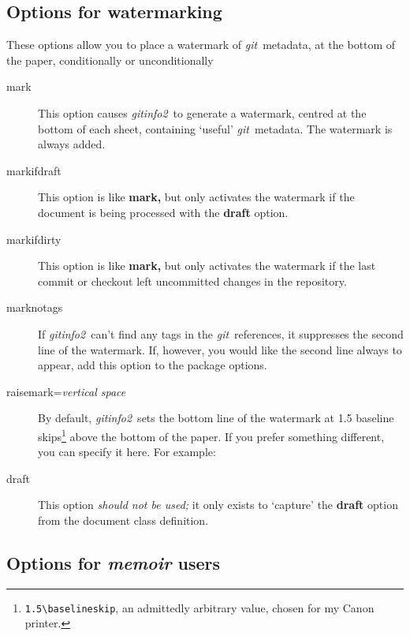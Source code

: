 \documentclass[draft,a4paper,12pt,twoside,openany]{memoir}
\newcommand{\sfit}[1]{\textit{#1}}
\newcommand{\git}{\sfit{git}}
\newcommand{\tpname}{\sfit{gitinfo2}}
\begin{document}
\subsection{Options for watermarking}

These options allow you to place a watermark of \git\ metadata, 
at the bottom of the paper, conditionally or unconditionally

\begin{description}

\item[mark]
This option causes \tpname\ to generate a watermark, 
centred at the bottom of each sheet,
containing `useful' \git\ metadata. 
The watermark is always added.

\item[markifdraft]
This option is like {\ttfamily\bfseries mark,}
but only activates the watermark if the document is being processed
with the {\ttfamily\bfseries draft} option. 

\item[markifdirty]
This option is like {\ttfamily\bfseries mark,}
but only activates the watermark if the last commit or checkout left 
uncommitted changes in the repository.

\item[marknotags]
If \tpname\ can't find any tags in the \git\ references,
it suppresses the second line of the watermark.
If, however, you would like the second line always to appear,
add this option to the package options.

\item[raisemark=\textit{vertical space}]
By default, \tpname\ sets the bottom line of the watermark
at 1.5 baseline 
skips\footnote{\texttt{1.5\textbackslash{}baselineskip}, an admittedly arbitrary value, chosen for my Canon printer.} 
above the bottom of the paper.
If you prefer something different, 
you can specify it here.
For example:

\begin{quote}
{\ttfamily
[raisemark=0.95\textbackslash{}paperheight]
}
\end{quote}


\item[draft]
This option \emph{should not be used;} it only exists to `capture' the 
{\ttfamily\bfseries draft} option from the document class definition.

\end{description}

\subsection{Options for \sfit{memoir} users}
\end{document}
